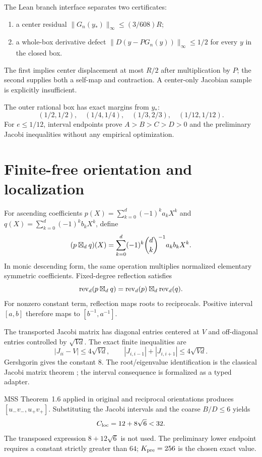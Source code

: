 \documentclass[10pt]{article}
\begin{document}
The Lean branch interface separates two certificates:
\begin{enumerate}
\item a center residual
$\|G_n(y_*)\|_\infty\le(3/608)R$;
\item a whole-box derivative defect
$\|D(y-PG_n(y))\|_\infty\le1/2$ for every $y$ in the closed box.
\end{enumerate}
The first implies center displacement at most $R/2$ after multiplication by
$P$; the second supplies both a self-map and contraction.  A center-only
Jacobian sample is explicitly insufficient.

The outer rational box has exact margins from $y_*$:
\[
 (1/2,1/2),\quad(1/4,1/4),\quad(1/3,2/3),\quad(1/12,1/12).
\]
For $e\le1/12$, interval endpoints prove $A>B>C>D>0$ and the preliminary
Jacobi inequalities without any empirical optimization.

\section{Finite-free orientation and localization}\label{sup:finitefree}

For ascending coefficients
$p(X)=\sum_{k=0}^{d}(-1)^ka_kX^k$ and
$q(X)=\sum_{k=0}^{d}(-1)^kb_kX^k$, define
\begin{equation}\label{sup:ascending-conv}
 (p\boxtimes_d q)(X)=
 \sum_{k=0}^{d}(-1)^k\binom dk^{-1}a_kb_kX^k.
\end{equation}
In monic descending form, the same operation multiplies normalized elementary
symmetric coefficients.  Fixed-degree reflection satisfies
\[
 \operatorname{rev}_d(p\boxtimes_d q)
 =\operatorname{rev}_d(p)\boxtimes_d\operatorname{rev}_d(q).
\]
For nonzero constant term, reflection maps roots to reciprocals.  Positive
interval $[a,b]$ therefore maps to $[b^{-1},a^{-1}]$.

The transported Jacobi matrix has diagonal entries centered at $V$ and
off-diagonal entries controlled by $\sqrt{Vd}$.  The exact finite inequalities
are
\[
 |J_{ii}-V|\le4\sqrt{Vd},\qquad
 |J_{i,i-1}|+|J_{i,i+1}|\le4\sqrt{Vd}.
\]
Gershgorin gives the constant $8$.  The root/eigenvalue identification is the
classical Jacobi matrix theorem \cite{Szego1975}; the interval consequence is
formalized as a typed adapter.

MSS Theorem~1.6 applied in original and reciprocal orientations produces
$[u_-v_-,u_+v_+]$.  Substituting the Jacobi intervals and the coarse
$B/D\le6$ yields
\[
 C_{\rm loc}=12+8\sqrt6<32.
\]
The transposed expression $8+12\sqrt6$ is not used.  The preliminary lower
endpoint requires a constant strictly greater than $64$; $K_{\rm pre}=256$
is the chosen exact value.
\end{document}
